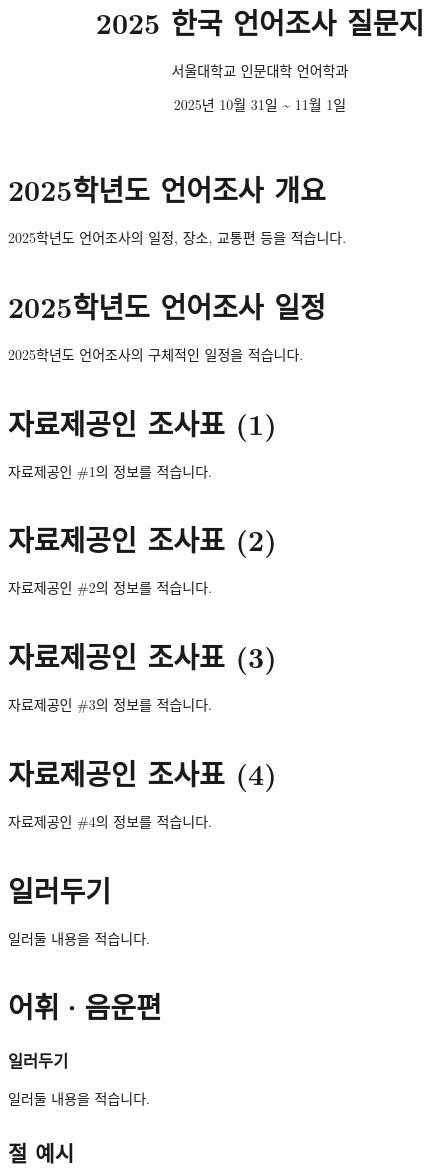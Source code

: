 \documentclass{snu-fl-questionnaire}
\title{2025 한국 언어조사 질문지}
\author{서울대학교 인문대학 언어학과}
\date{2025년 10월 31일 \textasciitilde{} 11월 1일}
\begin{document}
\frontmatter
\maketitle
\tableofcontents

\chapter{2025학년도 언어조사 개요}
2025학년도 언어조사의 일정, 장소, 교통편 등을 적습니다.

\chapter{2025학년도 언어조사 일정}
2025학년도 언어조사의 구체적인 일정을 적습니다.

\chapter{자료제공인 조사표 (1)}
자료제공인 \#1의 정보를 적습니다.

\chapter{자료제공인 조사표 (2)}
자료제공인 \#2의 정보를 적습니다.

\chapter{자료제공인 조사표 (3)}
자료제공인 \#3의 정보를 적습니다.

\chapter{자료제공인 조사표 (4)}
자료제공인 \#4의 정보를 적습니다.

\chapter{일러두기}
일러둘 내용을 적습니다.


\mainmatter
\chapter{어휘·음운편}
\subsection{일러두기}
일러둘 내용을 적습니다.

\section{절 예시}
\end{document}
